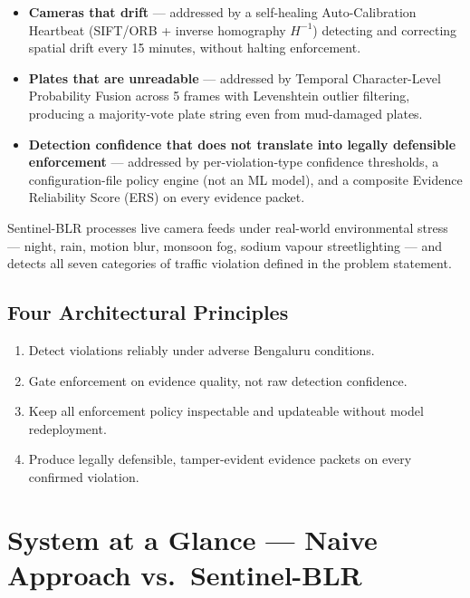 \documentclass[11pt,a4paper]{article}
\begin{document}
\begin{itemize}[leftmargin=1.8em, itemsep=0.3em]
    \item \textbf{Cameras that drift} — addressed by a self-healing Auto-Calibration Heartbeat (SIFT/ORB + inverse homography $H^{-1}$) detecting and correcting spatial drift every 15 minutes, without halting enforcement.
    \item \textbf{Plates that are unreadable} — addressed by Temporal Character-Level Probability Fusion across 5 frames with Levenshtein outlier filtering, producing a majority-vote plate string even from mud-damaged plates.
    \item \textbf{Detection confidence that does not translate into legally defensible enforcement} — addressed by per-violation-type confidence thresholds, a configuration-file policy engine (not an ML model), and a composite Evidence Reliability Score (ERS) on every evidence packet.
\end{itemize}

Sentinel-BLR processes live camera feeds under real-world environmental stress — night, rain, motion blur, monsoon fog, sodium vapour streetlighting — and detects all seven categories of traffic violation defined in the problem statement.

\subsection*{Four Architectural Principles}
\begin{enumerate}[leftmargin=1.8em, itemsep=0.2em]
    \item Detect violations reliably under adverse Bengaluru conditions.
    \item Gate enforcement on evidence quality, not raw detection confidence.
    \item Keep all enforcement policy inspectable and updateable without model redeployment.
    \item Produce legally defensible, tamper-evident evidence packets on every confirmed violation.
\end{enumerate}

\section{System at a Glance — Naive Approach vs.\ Sentinel-BLR}
\end{document}
